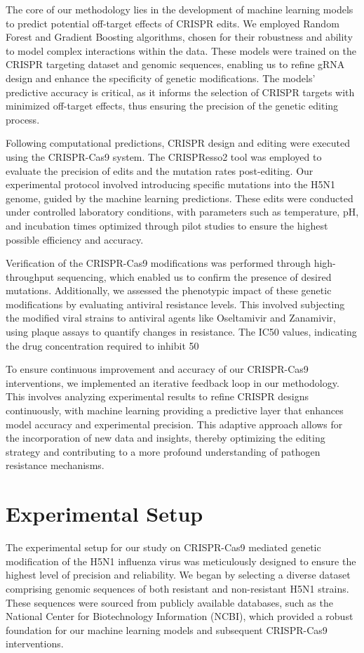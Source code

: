 \documentclass{article}
\begin{document}
The core of our methodology lies in the development of machine learning models to predict potential off-target effects of CRISPR edits. We employed Random Forest and Gradient Boosting algorithms, chosen for their robustness and ability to model complex interactions within the data. These models were trained on the CRISPR targeting dataset and genomic sequences, enabling us to refine gRNA design and enhance the specificity of genetic modifications. The models' predictive accuracy is critical, as it informs the selection of CRISPR targets with minimized off-target effects, thus ensuring the precision of the genetic editing process.

Following computational predictions, CRISPR design and editing were executed using the CRISPR-Cas9 system. The CRISPResso2 tool was employed to evaluate the precision of edits and the mutation rates post-editing. Our experimental protocol involved introducing specific mutations into the H5N1 genome, guided by the machine learning predictions. These edits were conducted under controlled laboratory conditions, with parameters such as temperature, pH, and incubation times optimized through pilot studies to ensure the highest possible efficiency and accuracy.

Verification of the CRISPR-Cas9 modifications was performed through high-throughput sequencing, which enabled us to confirm the presence of desired mutations. Additionally, we assessed the phenotypic impact of these genetic modifications by evaluating antiviral resistance levels. This involved subjecting the modified viral strains to antiviral agents like Oseltamivir and Zanamivir, using plaque assays to quantify changes in resistance. The IC50 values, indicating the drug concentration required to inhibit 50%

To ensure continuous improvement and accuracy of our CRISPR-Cas9 interventions, we implemented an iterative feedback loop in our methodology. This involves analyzing experimental results to refine CRISPR designs continuously, with machine learning providing a predictive layer that enhances model accuracy and experimental precision. This adaptive approach allows for the incorporation of new data and insights, thereby optimizing the editing strategy and contributing to a more profound understanding of pathogen resistance mechanisms.

\section{Experimental Setup}
The experimental setup for our study on CRISPR-Cas9 mediated genetic modification of the H5N1 influenza virus was meticulously designed to ensure the highest level of precision and reliability. We began by selecting a diverse dataset comprising genomic sequences of both resistant and non-resistant H5N1 strains. These sequences were sourced from publicly available databases, such as the National Center for Biotechnology Information (NCBI), which provided a robust foundation for our machine learning models and subsequent CRISPR-Cas9 interventions.
\end{document}
